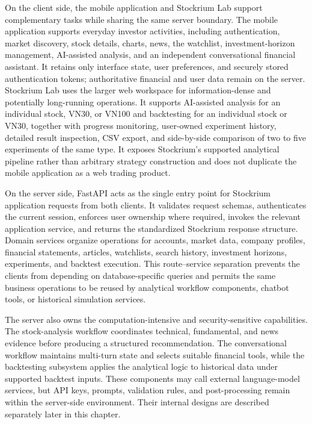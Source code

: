 On the client side, the mobile application and Stockrium Lab support complementary tasks while sharing the same server boundary. The mobile application supports everyday investor activities, including authentication, market discovery, stock details, charts, news, the watchlist, investment-horizon management, AI-assisted analysis, and an independent conversational financial assistant. It retains only interface state, user preferences, and securely stored authentication tokens; authoritative financial and user data remain on the server. Stockrium Lab uses the larger web workspace for information-dense and potentially long-running operations. It supports AI-assisted analysis for an individual stock, VN30, or VN100 and backtesting for an individual stock or VN30, together with progress monitoring, user-owned experiment history, detailed result inspection, CSV export, and side-by-side comparison of two to five experiments of the same type. It exposes Stockrium's supported analytical pipeline rather than arbitrary strategy construction and does not duplicate the mobile application as a web trading product.

On the server side, FastAPI acts as the single entry point for Stockrium application requests from both clients. It validates request schemas, authenticates the current session, enforces user ownership where required, invokes the relevant application service, and returns the standardized Stockrium response structure. Domain services organize operations for accounts, market data, company profiles, financial statements, articles, watchlists, search history, investment horizons, experiments, and backtest execution. This route--service separation prevents the clients from depending on database-specific queries and permits the same business operations to be reused by analytical workflow components, chatbot tools, or historical simulation services.

The server also owns the computation-intensive and security-sensitive capabilities. The stock-analysis workflow coordinates technical, fundamental, and news evidence before producing a structured recommendation. The conversational workflow maintains multi-turn state and selects suitable financial tools, while the backtesting subsystem applies the analytical logic to historical data under supported backtest inputs. These components may call external language-model services, but API keys, prompts, validation rules, and post-processing remain within the server-side environment. Their internal designs are described separately later in this chapter.

